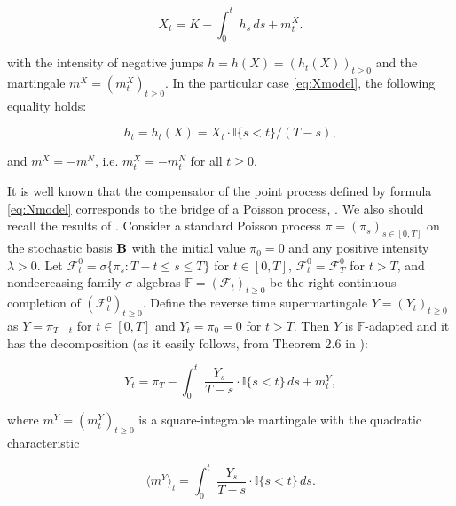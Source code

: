 

\begin{equation}\label{eq:Bmodel}

	X_t = K - \int_{0}^{t}\!\ h_s \,ds + {m_t^X}.

\end{equation}

with the intensity of negative jumps $h=h(X) = ({h_t}(X))_{t \geq 0}$ and the martingale $m^X=(m_t^X)_{t \geq 0}$. In the particular case \eqref{eq:Xmodel}, the following equality holds:

\begin{equation}\label{ht(X)}

	h_t = {h_t}(X) = X_t \cdot \mathbb{I}\{s< t\} / (T - s),

\end{equation}

and $m^X = - m^N$, i.e. $m_t^X = - m_t^N$ for all $t \geq 0$.



	It is well known that the compensator of the point process defined by formula \eqref{eq:Nmodel} corresponds to the bridge of a Poisson process, \cite{conforti}. We also should recall the results of \cite{jacod,  elliott}. Consider a standard Poisson process $\pi = (\pi_s)_{s \in [0, T]}$ on the stochastic basis  ${\textbf B}$ with the initial value $\pi_0 = 0$ and any positive intensity $\lambda > 0$. Let ${\mathscr{F}}_t^0 = \sigma\{\pi_s : T - t \leq s \leq T\}$ for $t \in [0, T]$, ${\mathscr{F}}_t^0 = {\mathscr{F}}_T^0$ for $t > T$,	and nondecreasing family $\sigma$-algebras ${\mathbb{F}}=({\mathscr{F}}_t)_{t\geq 0}$ be the right continuous completion of $({\mathscr{F}}_t^0)_{t\geq 0}$. Define the reverse time supermartingale $Y =(Y_t)_{t \geq 0}$ as $Y = \pi_{T-t}$ for $t \in [0, T]$ and $Y_t = \pi_0 = 0$ for $t > T$. Then $Y$ is $\mathbb{F}$-adapted and it has the decomposition (as it easily follows, from Theorem 2.6 in \cite{jacod}):

\begin{equation}\label{eq:Ymodel}

	Y_t = \pi_T - \int_{0}^{t}\!\ {\frac{Y_s}{T - s}}\cdot \mathbb{I}\{s< t\}\,ds + {m_t^Y},

\end{equation}

where $m^Y=(m_t^Y)_{t \geq 0}$ is a square-integrable martingale with the quadratic characteristic

\begin{equation}\label{eq:Ycharacteristic}

	{\langle {m^Y} \rangle}_t = \int_{0}^{t}\!\ {\frac{Y_s}{T - s}}\cdot \mathbb{I}\{s< t\}\,ds.

\end{equation}



